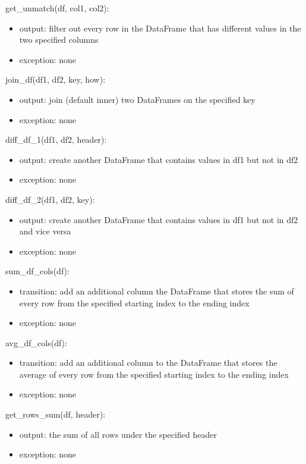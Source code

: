 \documentclass[12pt]{article}
\begin{document}
\noindent get\_unmatch(df, col1, col2):
\begin{itemize}
    \item output: filter out every row in the DataFrame that has different values in the two specified columns
    \item exception: none
\end{itemize}

\noindent join\_df(df1, df2, key, how):
\begin{itemize}
    \item output: join (default inner) two DataFrames on the specified key 
    \item exception: none
\end{itemize}

\noindent diff\_df\_1(df1, df2, header):
\begin{itemize}
    \item output: create another DataFrame that contains values in df1 but not in df2
    \item exception: none
\end{itemize}

\noindent diff\_df\_2(df1, df2, key):
\begin{itemize}
    \item output: create another DataFrame that contains values in df1 but not in df2 and vice versa
    \item exception: none
\end{itemize}

\noindent sum\_df\_cols(df):
\begin{itemize}
    \item transition: add an additional column the DataFrame that stores the sum of 
    every row from the specified starting index to the ending index
    \item exception: none
\end{itemize}

\noindent avg\_df\_cols(df):
\begin{itemize}
    \item transition: add an additional column to the DataFrame that stores the average of 
    every row from the specified starting index to the ending index
    \item exception: none
\end{itemize}

\noindent get\_rows\_sum(df, header):
\begin{itemize}
    \item output: the sum of all rows under the specified header
    \item exception: none
\end{itemize}
\end{document}
